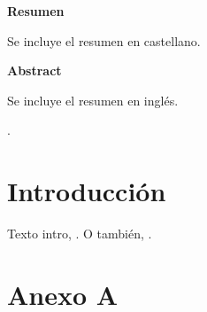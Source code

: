 \documentclass[12pt,a4paper,spanish,twoside]{article}
\begin{document}
\vspace{6.5cm}
\textbf{Resumen}

Se incluye el resumen en castellano.

\vspace{1cm}
\textbf{Abstract}

Se incluye el resumen en inglés.


\newpage
\setlength{\parskip}{0.8mm}
\tableofcontents
\newpage
\listoffigures
\newpage
\listoftables
\setlength{\parskip}{2.5mm}

\newpage


\renewcommand{\thepage}{}
\ifodd\thepage
\else
  .
  \thispagestyle{empty}
  \newpage
\fi
\setcounter{page}{1}
\fancyhf{}
\renewcommand{\headrulewidth}{0.4pt}


\fancyfoot[LE,RO]{\textbf{\thepage}}


\section{Introducción}
\label{sec:introduccion}

Texto intro, \cite{kreher05pseudocode}. O también, \citet{ohl97emp}.

\newpage




\newpage
\appendix
\section{Anexo A}
\label{anexo:Anexo}
\end{document}
